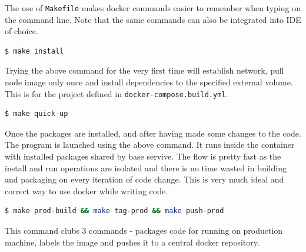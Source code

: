 \noindent
The use of \texttt{Makefile} makes docker commands easier to remember when typing on the command line. Note that the same commands can also be integrated into IDE of choice.

\begin{lstlisting}[language=bash]
  $ make install
\end{lstlisting}

\noindent
Trying the above command for the very first time will establish network, pull node image only once and install dependencies to the specified external volume. This is for the project defined in \texttt{docker-compose.build.yml}.

\begin{lstlisting}[language=bash]
  $ make quick-up
\end{lstlisting}

\noindent
Once the packages are installed, and after having made some changes to the code. The
program is launched using the above command. It runs inside the container with
installed packages shared by base servive. The flow is pretty fast as the install
and run operations are isolated and there is no time wasted in building and
packaging on every iteration of code change. This is very much ideal and
correct way to use docker while writing code.

\begin{lstlisting}[language=bash]
  $ make prod-build && make tag-prod && make push-prod
\end{lstlisting}
\noindent
This command clubs 3 commands - packages code for running on production machine, labels the image and pushes it to a central docker repository.

\pagebreak

